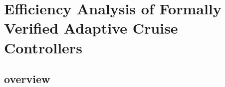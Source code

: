 \section{Efficiency Analysis of Formally Verified Adaptive Cruise Controllers}
\subsection*{overview}
